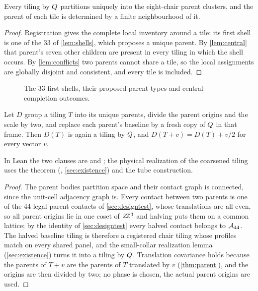 \begin{theorem}\label{thm:parent}
Every tiling by $Q$ partitions uniquely into the eight-chair parent clusters, and the
parent of each tile is determined by a finite neighbourhood of it.
\end{theorem}

\begin{proof}
Registration gives the complete local inventory around a tile: its first shell is one of the $33$
of \cref{lem:shells}, which proposes a unique parent. By \cref{lem:central} that parent's seven
other children are present in every tiling in which the shell occurs. By \cref{lem:conflicts}
two parents cannot share a tile, so the local assignments are globally disjoint and consistent,
and every tile is included.
\end{proof}

\begin{figure}[ht]
  \centering
  {\scriptsize}
  \caption{The $33$ first shells, their proposed parent types and central-completion outcomes.}
  \label{fig:shells}
\end{figure}

\begin{theorem}\label{thm:coarsening}
Let $D$ group a tiling $T$ into its unique parents, divide the parent origins and the scale by
two, and replace each parent's baseline by a fresh copy of $Q$ in that frame. Then $D(T)$ is
again a tiling by $Q$, and $D(T+v)=D(T)+v/2$ for every vector $v$.
\end{theorem}

In Lean the two clauses are  and
; the physical realization of the coarsened tiling
uses the theorem  (, \cref{sec:existence}) and
the tube construction.

\begin{proof}
The parent bodies partition space and their contact graph is connected, since the unit-cell
adjacency graph is. Every contact between two parents is one of the $44$ legal parent contacts
of \cref{sec:designtest}, whose translations are all even, so all parent origins lie in one coset
of $2\mathbb{Z}^3$ and halving puts them on a common lattice; by the identity of \cref{sec:designtest}
every halved contact belongs to $\mathcal{A}_{44}$. The halved baseline tiling is therefore a registered
chair tiling whose profiles match on every shared panel, and the small-collar realization lemma
(\cref{sec:existence}) turns it into a tiling by $Q$. Translation covariance holds because
the parents of $T+v$ are the parents of $T$ translated by $v$ (\cref{thm:parent}), and the
origins are then divided by two; no phase is chosen, the actual parent origins are used.
\end{proof}

